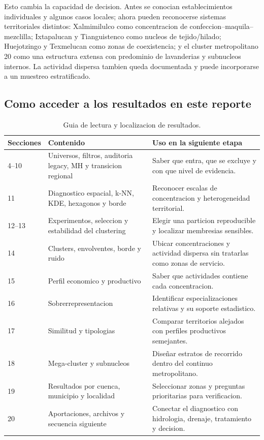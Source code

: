 \documentclass[11pt,letterpaper]{article}
\begin{document}
Esto cambia la capacidad de decision. Antes se conocian establecimientos individuales y algunos casos locales; ahora pueden reconocerse sistemas territoriales distintos: Xalmimilulco como concentracion de confeccion--maquila--mezclilla; Ixtapalucan y Tianguistenco como nucleos de tejido/hilado; Huejotzingo y Texmelucan como zonas de coexistencia; y el cluster metropolitano 20 como una estructura extensa con predominio de lavanderias y subnucleos internos. La actividad dispersa tambien queda documentada y puede incorporarse a un muestreo estratificado.

\subsection{Como acceder a los resultados en este reporte}

\begin{table}[H]
\centering
\small
\caption{Guia de lectura y localizacion de resultados.}
\begin{tabularx}{\textwidth}{p{2.0cm}p{4.4cm}X}
\toprule
\textbf{Secciones} & \textbf{Contenido} & \textbf{Uso en la siguiente etapa} \\
\midrule
4--10 & Universos, filtros, auditoria legacy, MH y transicion regional & Saber que entra, que se excluye y con que nivel de evidencia. \\
11 & Diagnostico espacial, k-NN, KDE, hexagonos y borde & Reconocer escalas de concentracion y heterogeneidad territorial. \\
12--13 & Experimentos, seleccion y estabilidad del clustering & Elegir una particion reproducible y localizar membresias sensibles. \\
14 & Clusters, envolventes, borde y ruido & Ubicar concentraciones y actividad dispersa sin tratarlas como zonas de servicio. \\
15 & Perfil economico y productivo & Saber que actividades contiene cada concentracion. \\
16 & Sobrerrepresentacion & Identificar especializaciones relativas y su soporte estadistico. \\
17 & Similitud y tipologias & Comparar territorios alejados con perfiles productivos semejantes. \\
18 & Mega-cluster y subnucleos & Diseñar estratos de recorrido dentro del continuo metropolitano. \\
19 & Resultados por cuenca, municipio y localidad & Seleccionar zonas y preguntas prioritarias para verificacion. \\
20 & Aportaciones, archivos y secuencia siguiente & Conectar el diagnostico con hidrologia, drenaje, tratamiento y decision. \\
\bottomrule
\end{tabularx}
\end{table}
\end{document}

